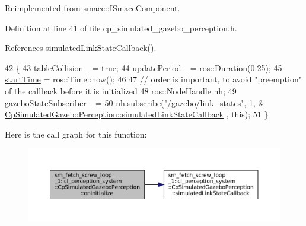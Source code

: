 Reimplemented from \hyperlink{classsmacc_1_1ISmaccComponent_ae6f71d008db12553912e9436184b9e65}{smacc\+::\+I\+Smacc\+Component}.



Definition at line 41 of file cp\+\_\+simulated\+\_\+gazebo\+\_\+perception.\+h.



References simulated\+Link\+State\+Callback().


\begin{DoxyCode}
42             \{                
43                 \hyperlink{classsm__fetch__screw__loop__1_1_1cl__perception__system_1_1CpSimulatedGazeboPerception_a352d1bef0db5717071647953ec4edcb7}{tableCollision\_} = \textcolor{keyword}{true};
44                 \hyperlink{classsm__fetch__screw__loop__1_1_1cl__perception__system_1_1CpSimulatedGazeboPerception_a27e862c79209a76a3966c73d6a63083f}{updatePeriod\_} = ros::Duration(0.25);
45                 \hyperlink{classsm__fetch__screw__loop__1_1_1cl__perception__system_1_1CpSimulatedGazeboPerception_a7b016c50f24f70b2898ba548dedbf6a5}{startTime} = ros::Time::now();
46                 
47                 \textcolor{comment}{// order is important, to avoid "preemption" of the callback before it is initialized}
48                 ros::NodeHandle nh;
49                 \hyperlink{classsm__fetch__screw__loop__1_1_1cl__perception__system_1_1CpSimulatedGazeboPerception_a45b284b336532037f62ce2c81475cf08}{gazeboStateSubscriber\_} =
50                     nh.subscribe(\textcolor{stringliteral}{"/gazebo/link\_states"}, 1, &
      \hyperlink{classsm__fetch__screw__loop__1_1_1cl__perception__system_1_1CpSimulatedGazeboPerception_a83c115c056525c3b3da790ef020b3add}{CpSimulatedGazeboPerception::simulatedLinkStateCallback}
      , \textcolor{keyword}{this});
51             \}
\end{DoxyCode}
Here is the call graph for this function\+:
\nopagebreak
\begin{figure}[H]
\begin{center}
\leavevmode
\includegraphics[width=350pt]{classsm__fetch__screw__loop__1_1_1cl__perception__system_1_1CpSimulatedGazeboPerception_a2cde9f6f8ba4b5b660f7ac8cf86f9e29_cgraph}
\end{center}
\end{figure}
